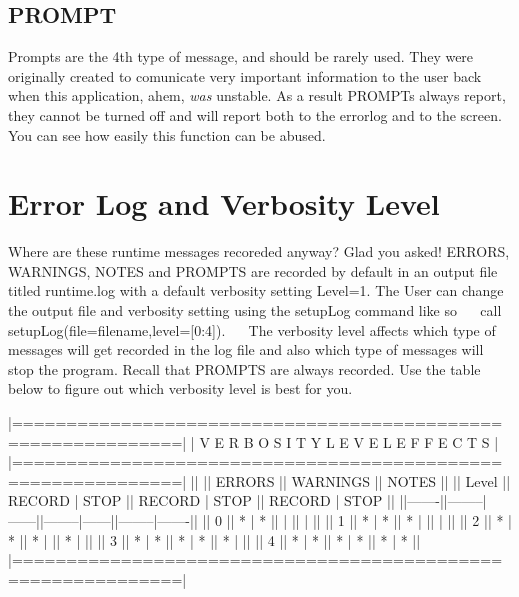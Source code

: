 \hypertarget{_interface_PROMPT}{}\subsection{P\+R\+O\+M\+PT}\label{_interface_PROMPT}
Prompts are the 4th type of message, and should be rarely used. They were originally created to comunicate very important information to the user back when this application, ahem, {\itshape was} unstable. As a result P\+R\+O\+M\+P\+Ts always report, they cannot be turned off and will report both to the errorlog and to the screen. You can see how easily this function can be abused.~\newline
\hypertarget{_interface_ERRORLOG}{}\section{Error Log and Verbosity Level}\label{_interface_ERRORLOG}
Where are these runtime messages recoreded anyway? Glad you asked! E\+R\+R\+O\+RS, W\+A\+R\+N\+I\+N\+GS, N\+O\+T\+ES and P\+R\+O\+M\+P\+TS are recorded by default in an output file titled \textquotesingle{}runtime.\+log\textquotesingle{} with a default verbosity setting Level=1. The User can change the output file and verbosity setting using the \textquotesingle{}setup\+Log\textquotesingle{} command like so~\newline
~\newline
 call setup\+Log(file=filename,level=\mbox{[}0\+:4\mbox{]}).~\newline
~\newline
The verbosity level affects which type of messages will get recorded in the log file and also which type of messages will stop the program. Recall that P\+R\+O\+M\+P\+TS are always recorded. Use the table below to figure out which verbosity level is best for you.~\newline
~\newline
\begin{DoxyVerb}|=============================================================|
|         V E R B O S I T Y   L E V E L   E F F E C T S       |
|=============================================================|
||       ||     ERRORS    ||     WARNINGS  ||      NOTES     ||
|| Level || RECORD | STOP || RECORD | STOP || RECORD | STOP  ||
||-------||--------|------||--------|------||--------|-------||
||   0   ||   *    |  *   ||        |      ||        |       ||
||   1   ||   *    |  *   ||   *    |      ||        |       ||
||   2   ||   *    |  *   ||   *    |      ||   *    |       ||
||   3   ||   *    |  *   ||   *    |  *   ||   *    |       ||
||   4   ||   *    |  *   ||   *    |  *   ||   *    |   *   ||
|=============================================================|
\end{DoxyVerb}
